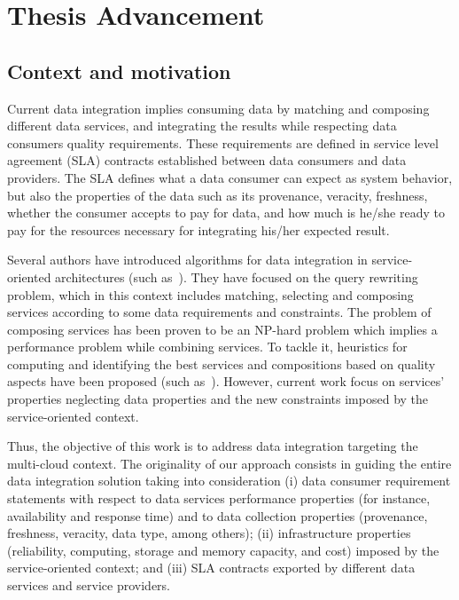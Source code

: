 \chapter{Thesis Advancement}
\label{chap:context}
\minitoc

\section{Context and motivation}

Current data integration implies consuming data by matching and composing different data services, and integrating the results while respecting data consumers quality requirements. 
%
These requirements are defined in service level agreement (SLA) contracts 
established between data consumers and data providers.
%
The SLA defines what a data consumer can expect as system behavior, 
but also the properties of the data such as its provenance, veracity, freshness, whether the consumer accepts to pay for data, and how much is he/she ready to pay for the resources necessary for integrating his/her expected result. 

%
Several authors have introduced algorithms for data integration in service-oriented architectures (such as~\cite{Barhamgi2010,Umberto,Benouaret2011,ba2014}).
%
They have focused on the query rewriting problem, which in this context includes matching, selecting and composing services
according to some data requirements and constraints. 
%
The problem of composing services has been proven to be an NP-hard problem which implies a performance problem while combining services.
%
To tackle it, heuristics for computing and identifying the best services and compositions based on quality aspects have been proposed (such as~\cite{Cardoso2004,Berbner2006,Menasce:2008,Sasikaladevi2014}).
%
However, current work focus on services' properties neglecting data properties and the new constraints imposed by the service-oriented context. 

%
Thus, the objective of this work is to address data integration targeting the multi-cloud context. 
%
The originality of our approach consists in guiding the entire data integration solution taking into consideration (i) data consumer requirement statements with respect to data services performance properties (for instance, availability and response time) and to data collection properties (provenance, freshness, veracity, data type, among others); (ii) infrastructure properties (reliability, computing, storage and memory capacity, and cost) imposed by the service-oriented context; and (iii) SLA contracts exported by different data services and service providers.
%
%
%

